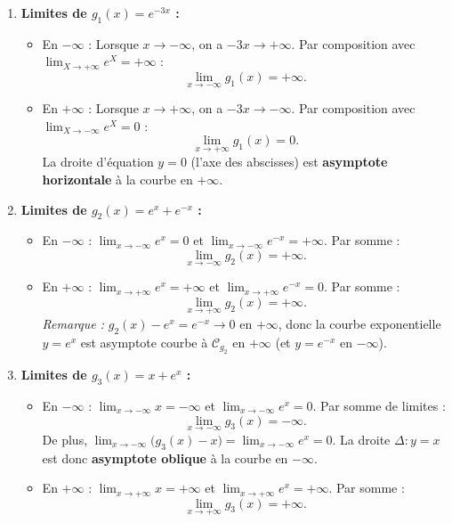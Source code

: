 \documentclass[11pt,a4paper]{article}
\begin{document}
\begin{correctionbox}[Exercice 9]
\begin{enumerate}[label=\textbf{\arabic*.}]
    \item \textbf{Limites de $g_1(x) = e^{-3x}$ :}
    \begin{itemize}
        \item En $-\infty$ : Lorsque $x \to -\infty$, on a $-3x \to +\infty$. Par composition avec $\lim_{X \to +\infty} e^X = +\infty$ :
        \[
        \boxed{\lim_{x \to -\infty} g_1(x) = +\infty}.
        \]
        \item En $+\infty$ : Lorsque $x \to +\infty$, on a $-3x \to -\infty$. Par composition avec $\lim_{X \to -\infty} e^X = 0$ :
        \[
        \boxed{\lim_{x \to +\infty} g_1(x) = 0}.
        \]
        La droite d'équation $y = 0$ (l'axe des abscisses) est \textbf{asymptote horizontale} à la courbe en $+\infty$.
    \end{itemize}

    \item \textbf{Limites de $g_2(x) = e^x + e^{-x}$ :}
    \begin{itemize}
        \item En $-\infty$ : $\lim_{x \to -\infty} e^x = 0$ et $\lim_{x \to -\infty} e^{-x} = +\infty$. Par somme :
        \[
        \boxed{\lim_{x \to -\infty} g_2(x) = +\infty}.
        \]
        \item En $+\infty$ : $\lim_{x \to +\infty} e^x = +\infty$ et $\lim_{x \to +\infty} e^{-x} = 0$. Par somme :
        \[
        \boxed{\lim_{x \to +\infty} g_2(x) = +\infty}.
        \]
        \textit{Remarque :} $g_2(x) - e^x = e^{-x} \to 0$ en $+\infty$, donc la courbe exponentielle $y = e^x$ est asymptote courbe à $\mathcal{C}_{g_2}$ en $+\infty$ (et $y = e^{-x}$ en $-\infty$).
    \end{itemize}

    \item \textbf{Limites de $g_3(x) = x + e^x$ :}
    \begin{itemize}
        \item En $-\infty$ : $\lim_{x \to -\infty} x = -\infty$ et $\lim_{x \to -\infty} e^x = 0$. Par somme de limites :
        \[
        \boxed{\lim_{x \to -\infty} g_3(x) = -\infty}.
        \]
        De plus, $\lim_{x \to -\infty} \bigl(g_3(x) - x\bigr) = \lim_{x \to -\infty} e^x = 0$.
        La droite $\Delta : y = x$ est donc \textbf{asymptote oblique} à la courbe en $-\infty$.
        \item En $+\infty$ : $\lim_{x \to +\infty} x = +\infty$ et $\lim_{x \to +\infty} e^x = +\infty$. Par somme :
        \[
        \boxed{\lim_{x \to +\infty} g_3(x) = +\infty}.
        \]
    \end{itemize}


\end{enumerate}
\end{correctionbox}
\end{document}

